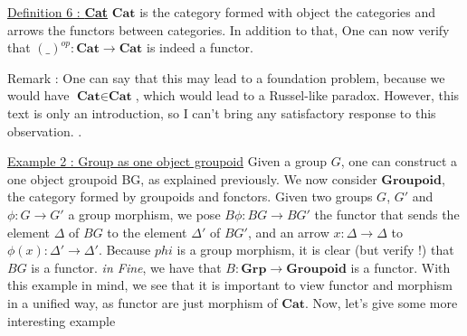 \documentclass{article}
\begin{document}
{\newline \newline \newline
\noindent \large \underline{Definition 6 : \textbf{Cat}} \newline \normalsize \newline
$\textbf{Cat}$ is the category formed with object the categories and arrows the functors between categories. In addition to that, One can now verify that  $(\_)^{op} : \textbf{Cat} \rightarrow \textbf{Cat}$ is indeed a functor.  \newline

\noindent Remark : One can say that this may lead to a foundation problem, because we would have $\textbf{Cat} \in \textbf{Cat}$, which would lead to a Russel-like paradox. However, this text is only an introduction, so I can't bring any satisfactory response to this observation. \newline.

\noindent \large \underline{Example 2 : Group as one object groupoid} \newline \normalsize \newline
Given a group $ G$, one can construct a one object groupoid BG, as explained previously. We now consider $\textbf{Groupoid}$, the category formed by groupoids and fonctors.  \newline 
Given two groups $G$,  $G'$ and $\phi : G \rightarrow G'$ a group morphism, we pose $B\phi : BG \rightarrow BG'$ the functor that sends the element $\Delta$ of $BG$ to the element $\Delta'$ of $BG'$, and an arrow $x : \Delta \rightarrow \Delta$ to $\phi(x) : \Delta' \rightarrow \Delta'$. Because $phi$ is a group morphism, it is clear (but verify !) that $BG$ is a functor. \newline \newline
\textit{in Fine}, we have that $B : \textbf{Grp} \rightarrow \textbf{Groupoid}$ is a functor. \newline
With this example in mind, we see that it is important to view functor and morphism in a unified way, as functor are just morphism of $\textbf{Cat}$. Now, let's give some more interesting example
\newline \newline



}
\end{document}
